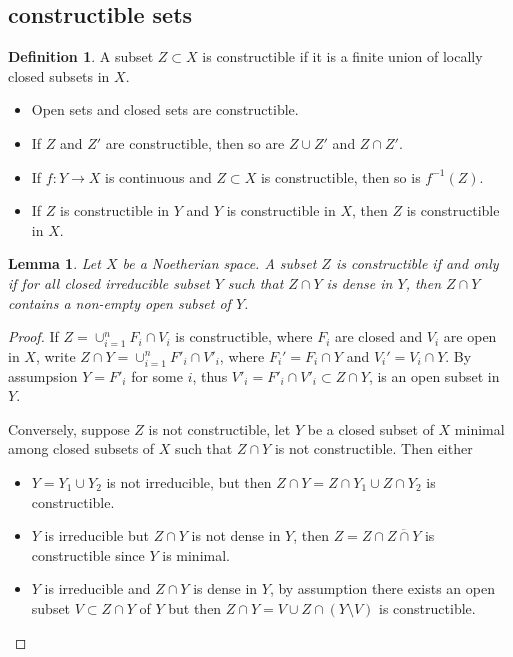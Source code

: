 \documentclass[leqno]{amsart}
\newcommand{\1}{\mathbf{1}}
\newtheorem{lem}[thm]{Lemma}
\theoremstyle{definition}
\newtheorem{defn}[thm]{Definition}
\theoremstyle{remark}
\begin{document}
\subsection{constructible sets}

\begin{defn}
	A subset $Z\subset X$ is constructible 
	if it is a finite union of locally closed subsets in  $X$.
\end{defn}
\begin{itemize}
	\item Open sets and closed sets are constructible.
	\item If $Z$ and  $Z'$ are constructible,
		then so are  $Z\cup Z'$ and  $Z\cap Z'$.
	\item If  $f\colon Y\to X$ is continuous and  
		$Z\subset X$ is constructible, then so is $f^{-1}(Z)$.
	\item If  $Z$ is constructible in  $Y$ and 
		$Y$ is constructible in  $X$, 
		then $Z$ is constructible in  $X$.
\end{itemize}

\begin{lem}
	Let $X$ be a Noetherian space.
	A subset $Z$ is constructible if and only if 
	for all closed irreducible subset  $Y$ 
	such that $Z\cap Y$ is dense in  $Y$,
	then  $Z\cap Y$ contains 
	a non-empty open subset of  $Y$.
\end{lem}
\begin{proof}
	If $Z=\cup_{i=1}^nF_i\cap V_i$ is constructible,
	where $F_i$ are closed and  $V_i$ are open in $X$,
	write $Z\cap Y=\cup_{i=1}^nF'_i\cap V'_i$,
	where $F_i'=F_i\cap Y$ and  $V_i'=V_i\cap Y$.
	By assumpsion  $Y=F'_i$ for some  $i$,
	thus $V'_i=F'_i\cap V'_i\subset Z\cap Y$,
	is an open subset in  $Y$.

	Conversely,
	suppose $Z$ is not constructible,
	let $Y$ be a closed subset of $X$
	minimal among closed subsets of $X$ such that 
	$Z\cap Y$ is not constructible. 
	Then either
	\begin{itemize}
		\item $Y=Y_1\cup Y_2$ is not irreducible,
			but then  $Z\cap Y=Z\cap Y_1\cup Z\cap Y_2$
			is constructible.
		\item  $Y$ is irreducible but  $Z\cap Y$ is not dense in  $Y$,
			then  $Z=Z\cap \overline{Z\cap Y}$ is constructible
			since $Y$ is minimal.
		\item  $Y$ is irreducible and $Z\cap Y$ is dense in  $Y$,
			by assumption there exists an open subset 
			$V\subset Z\cap Y$ of $Y$
			but then $Z\cap Y=V\cup Z\cap (Y\setminus V)$
			is constructible.
	\end{itemize}
\end{proof}

\end{document}
